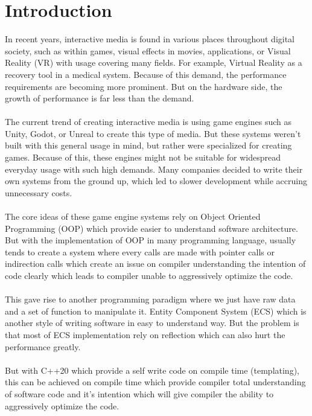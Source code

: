 \section{Introduction}
\label{sec:introduction}
In recent years, interactive media is found in various places throughout digital society,
such as within games, visual effects in movies, applications, or Visual Reality (VR)
with usage covering many fields.
For example, Virtual Reality as a recovery tool in a medical system.
Because of this demand, the performance requirements are becoming more prominent.
But on the hardware side, the growth of performance
is far less than the demand.
\\\\
The current trend of creating interactive media is using game engines such as Unity, Godot, or
Unreal to create this type of media.
But these systems weren't built with this general usage in mind, but rather were specialized for creating games.
Because of this, these engines might not be suitable for widespread everyday usage with such high demands.
Many companies decided to write their own systems from the ground up, which led to slower development while accruing
unnecessary costs.
\\\\
The core ideas of these game engine systems rely on Object Oriented Programming (OOP) which provide easier to understand
software architecture.
But with the implementation of OOP in many programming language, usually tends to create a system where every calls are
made with pointer calls or indirection calls which create an issue on compiler understanding the intention of code
clearly which leads to compiler unable to aggressively optimize the code.
\\\\
This gave rise to another programming paradigm where we just have raw data and a set of function to manipulate it.
Entity Component System (ECS) which is another style of writing software in easy to understand way.
But the problem is that most of ECS implementation rely on reflection which can also hurt the performance greatly.
\\\\
But with C++20 which provide a self write code on compile time (templating), this can be achieved on compile time
which provide compiler total understanding of software code and it's intention which will give compiler the ability
to aggressively optimize the code.
\\\\
